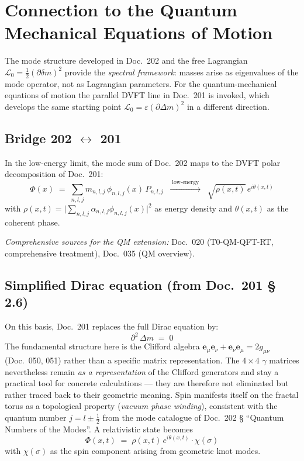 \section{Connection to the Quantum Mechanical Equations of Motion}

The mode structure developed in Doc.~202 and the free Lagrangian
$\mathcal{L}_0 = \tfrac12(\partial\delta m)^2$ provide the
\emph{spectral framework}: masses arise as eigenvalues of the mode
operator, not as Lagrangian parameters. For the quantum-mechanical
equations of motion the parallel DVFT line in Doc.~201 is invoked,
which develops the same starting point
$\mathcal{L}_0 = \varepsilon(\partial\Delta m)^2$ in a different
direction.

\subsection*{Bridge 202 $\leftrightarrow$ 201}

In the low-energy limit, the mode sum of Doc.~202 maps to the DVFT
polar decomposition of Doc.~201:
\begin{equation}
  \Phi(x) \;=\; \sum_{n,l,j} m_{n,l,j}\,\phi_{n,l,j}(x)\,P_{n,l,j}
  \;\;\xrightarrow{\;\text{low-energy}\;}\;\;
  \sqrt{\rho(x,t)}\,e^{i\theta(x,t)}
  \tag{202.\,QM-1}
\end{equation}
with
$\rho(x,t) = \big|\sum_{n,l,j} \alpha_{n,l,j}\phi_{n,l,j}(x)\big|^2$
as energy density and $\theta(x,t)$ as the coherent phase.

\textit{Comprehensive sources for the QM extension:} Doc.~020
(T0-QM-QFT-RT, comprehensive treatment), Doc.~035 (QM overview).

\subsection*{Simplified Dirac equation (from Doc.~201 \S\,2.6)}

On this basis, Doc.~201 replaces the full Dirac equation by:
\begin{equation}
  \partial^{2}\,\Delta m \;=\; 0
  \tag{202.\,QM-2}
\end{equation}
The fundamental structure here is the Clifford algebra
$\mathbf{e}_\mu\mathbf{e}_\nu + \mathbf{e}_\nu\mathbf{e}_\mu = 2g_{\mu\nu}$
(Doc.~050, 051) rather than a specific matrix representation. The
$4\times 4$ $\gamma$ matrices nevertheless remain \emph{as a
representation} of the Clifford generators and stay a practical tool
for concrete calculations --- they are therefore not eliminated but
rather traced back to their geometric meaning. Spin manifests itself
on the fractal torus as a topological property
(\emph{vacuum phase winding}), consistent with the quantum number
$j = l \pm \tfrac12$ from the mode catalogue of Doc.~202 \S
\enquote{Quantum Numbers of the Modes}. A relativistic state becomes
\begin{equation}
  \Phi(x,t) \;=\; \rho(x,t)\,e^{i\theta(x,t)}\cdot \chi(\sigma)
  \tag{202.\,QM-3}
\end{equation}
with $\chi(\sigma)$ as the spin component arising from geometric
knot modes.

